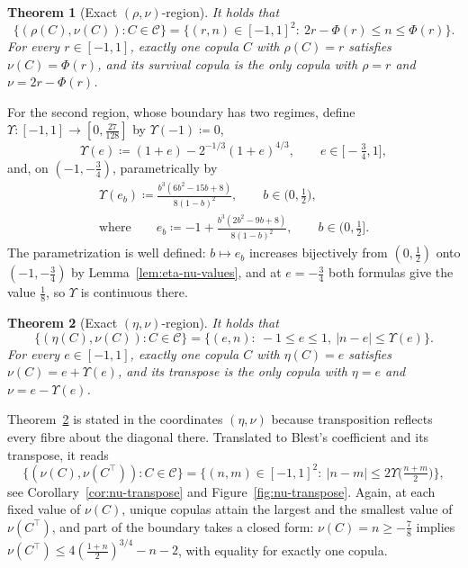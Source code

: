 \documentclass[11pt,a4paper]{article}
\newtheorem{theorem}{Theorem}[section]
\theoremstyle{remark}
\newcommand{\1}{\mathbf{1}}
\newcommand{\CC}{\mathcal{C}}
\begin{document}
\begin{theorem}[Exact $(\rho,\nu)$-region]
\label{thm:rho-nu}
It holds that
\[
  \bigl\{(\rho(C),\nu(C)):C\in\CC\bigr\}
  =\bigl\{(r,n)\in[-1,1]^2:\ 2r-\Phi(r)\le n\le\Phi(r)\bigr\}.
\]
For every $r\in[-1,1]$, exactly one copula $C$ with $\rho(C)=r$ satisfies $\nu(C)=\Phi(r)$, and its survival copula is the only copula with $\rho=r$ and $\nu=2r-\Phi(r)$.
\end{theorem}

For the second region, whose boundary has two regimes, define $\Upsilon:[-1,1]\to[0,\frac{27}{128}]$ by $\Upsilon(-1)\coloneqq0$,
\begin{equation}
  \label{eq:Upsilon-def}
  \Upsilon(e)\coloneqq(1+e)-2^{-1/3}(1+e)^{4/3},
  \qquad e\in\bigl[-\tfrac34,1\bigr],
\end{equation}
and, on $(-1,-\frac34)$, parametrically by
\begin{equation}
  \label{eq:Upsilon-param}
  \begin{gathered}
  \Upsilon(e_b)\coloneqq\frac{b^3(6b^2-15b+8)}{8(1-b)^2},
  \qquad b\in\bigl(0,\tfrac12\bigr),\\[0.5ex]
  \text{where}\qquad
  e_b\coloneqq-1+\frac{b^3(2b^2-9b+8)}{8(1-b)^2},
  \qquad b\in\bigl(0,\tfrac12\bigr].
  \end{gathered}
\end{equation}
The parametrization is well defined: $b\mapsto e_b$ increases bijectively from $(0,\frac12)$ onto $(-1,-\frac34)$ by Lemma~\ref{lem:eta-nu-values}, and at $e=-\frac34$ both formulas give the value $\frac18$, so $\Upsilon$ is continuous there.

\begin{theorem}[Exact $(\eta,\nu)$-region]
\label{thm:eta-nu}
It holds that
\[
  \bigl\{(\eta(C),\nu(C)):C\in\CC\bigr\}
  =\bigl\{(e,n):\ -1\le e\le1,\ |n-e|\le\Upsilon(e)\bigr\}.
\]
For every $e\in[-1,1]$, exactly one copula $C$ with $\eta(C)=e$ satisfies $\nu(C)=e+\Upsilon(e)$, and its transpose is the only copula with $\eta=e$ and $\nu=e-\Upsilon(e)$.
\end{theorem}

Theorem~\ref{thm:eta-nu} is stated in the coordinates $(\eta,\nu)$ because transposition reflects every fibre about the diagonal there.
Translated to Blest's coefficient and its transpose, it reads
\[
  \bigl\{(\nu(C),\nu(C^\top)):C\in\CC\bigr\}
  =\bigl\{(n,m)\in[-1,1]^2:\ |n-m|\le2\Upsilon\bigl(\tfrac{n+m}{2}\bigr)\bigr\},
\]
see Corollary~\ref{cor:nu-transpose} and Figure~\ref{fig:nu-transpose}.
Again, at each fixed value of $\nu(C)$, unique copulas attain the largest and the smallest value of $\nu(C^\top)$, and part of the boundary takes a closed form: $\nu(C)=n\ge-\frac78$ implies $\nu(C^\top)\le4(\frac{1+n}{2})^{3/4}-n-2$, with equality for exactly one copula.
\end{document}
